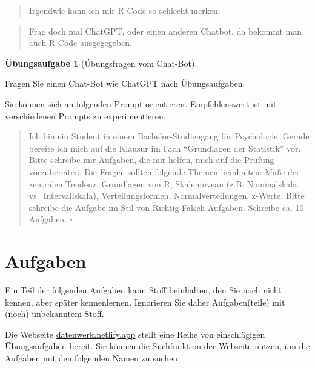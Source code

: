 \documentclass[
  letterpaper,
  oneside,
  open=any]{scrbook}
\theoremstyle{definition}
\newtheorem{exercise}{Übungsaufgabe}[chapter]
\theoremstyle{definition}
\theoremstyle{definition}
\theoremstyle{remark}
\begin{document}
\begin{quote}
{} Irgendwie kann ich mir R-Code so schlecht merken.
\end{quote}

\begin{quote}
{} Frag doch mal ChatGPT, oder einen anderen Chatbot, da
bekommt man auch R-Code ausgegegeben.
\end{quote}

\begin{exercise}[Übungsfragen vom
Chat-Bot]\protect\hypertarget{exr-chatgpt}{}\label{exr-chatgpt}

Fragen Sie einen Chat-Bot wie ChatGPT nach Übungsaufgaben.

Sie können sich an folgenden Prompt orientieren. Empfehlenswert ist mit
verschiedenen Prompts zu experimentieren.

\begin{quote}
{} Ich bin ein Student in einem Bachelor-Studiengang für
Psychologie. Gerade bereite ich mich auf die Klausur im Fach
\enquote{Grundlagen der Statistik} vor. Bitte schreibe mir Aufgaben, die
mir helfen, mich auf die Prüfung vorzubereiten. Die Fragen sollten
folgende Themen beinhalten: Maße der zentralen Tendenz, Grundlagen von
R, Skalenniveau (z.B. Nominalskala vs.~Intervallskala),
Verteilungsformen, Normalverteilungen, z-Werte. Bitte schreibe die
Aufgabe im Stil von Richtig-Falsch-Aufgaben. Schreibe ca. 10 Aufgaben.
\(\square\)
\end{quote}

\end{exercise}

\section{Aufgaben}\label{aufgaben-4}

Ein Teil der folgenden Aufgaben kann Stoff beinhalten, den Sie noch
nicht kennen, aber später kennenlernen. Ignorieren Sie daher
Aufgaben(teile) mit (noch) unbekanntem Stoff.

Die Webseite \href{https://datenwerk.netlify.app}{datenwerk.netlify.app}
stellt eine Reihe von einschlägigen Übungsaufgaben bereit. Sie können
die Suchfunktion der Webseite nutzen, um die Aufgaben mit den folgenden
Namen zu suchen:
\end{document}
